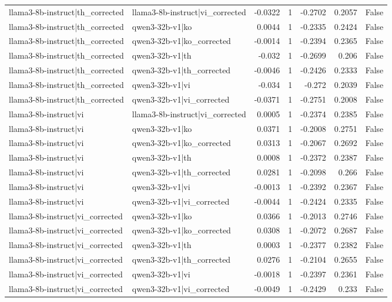 \begin{table}
\begin{tabular}{l l r r r r l}
llama3-8b-instruct|th_corrected & llama3-8b-instruct|vi_corrected & -0.0322 & 1 & -0.2702 & 0.2057 & False \\
llama3-8b-instruct|th_corrected & qwen3-32b-v1|ko & 0.0044 & 1 & -0.2335 & 0.2424 & False \\
llama3-8b-instruct|th_corrected & qwen3-32b-v1|ko_corrected & -0.0014 & 1 & -0.2394 & 0.2365 & False \\
llama3-8b-instruct|th_corrected & qwen3-32b-v1|th & -0.032 & 1 & -0.2699 & 0.206 & False \\
llama3-8b-instruct|th_corrected & qwen3-32b-v1|th_corrected & -0.0046 & 1 & -0.2426 & 0.2333 & False \\
llama3-8b-instruct|th_corrected & qwen3-32b-v1|vi & -0.034 & 1 & -0.272 & 0.2039 & False \\
llama3-8b-instruct|th_corrected & qwen3-32b-v1|vi_corrected & -0.0371 & 1 & -0.2751 & 0.2008 & False \\
llama3-8b-instruct|vi & llama3-8b-instruct|vi_corrected & 0.0005 & 1 & -0.2374 & 0.2385 & False \\
llama3-8b-instruct|vi & qwen3-32b-v1|ko & 0.0371 & 1 & -0.2008 & 0.2751 & False \\
llama3-8b-instruct|vi & qwen3-32b-v1|ko_corrected & 0.0313 & 1 & -0.2067 & 0.2692 & False \\
llama3-8b-instruct|vi & qwen3-32b-v1|th & 0.0008 & 1 & -0.2372 & 0.2387 & False \\
llama3-8b-instruct|vi & qwen3-32b-v1|th_corrected & 0.0281 & 1 & -0.2098 & 0.266 & False \\
llama3-8b-instruct|vi & qwen3-32b-v1|vi & -0.0013 & 1 & -0.2392 & 0.2367 & False \\
llama3-8b-instruct|vi & qwen3-32b-v1|vi_corrected & -0.0044 & 1 & -0.2424 & 0.2335 & False \\
llama3-8b-instruct|vi_corrected & qwen3-32b-v1|ko & 0.0366 & 1 & -0.2013 & 0.2746 & False \\
llama3-8b-instruct|vi_corrected & qwen3-32b-v1|ko_corrected & 0.0308 & 1 & -0.2072 & 0.2687 & False \\
llama3-8b-instruct|vi_corrected & qwen3-32b-v1|th & 0.0003 & 1 & -0.2377 & 0.2382 & False \\
llama3-8b-instruct|vi_corrected & qwen3-32b-v1|th_corrected & 0.0276 & 1 & -0.2104 & 0.2655 & False \\
llama3-8b-instruct|vi_corrected & qwen3-32b-v1|vi & -0.0018 & 1 & -0.2397 & 0.2361 & False \\
llama3-8b-instruct|vi_corrected & qwen3-32b-v1|vi_corrected & -0.0049 & 1 & -0.2429 & 0.233 & False \\

\end{tabular}
\end{table}
